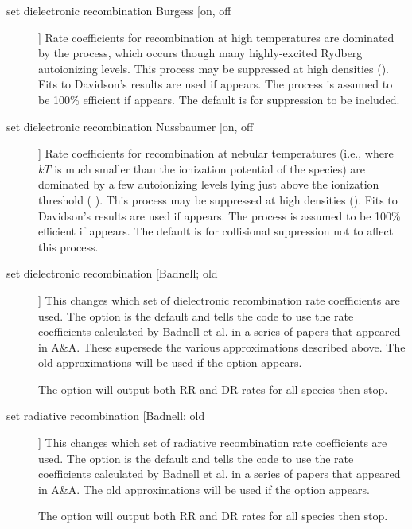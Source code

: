 \begin{description}
\item[set dielectronic recombination Burgess [on, off]]  Rate coefficients
for recombination at high temperatures are dominated by the \citet{Burgess1965}
process, which occurs though many highly-excited Rydberg autoionizing levels.
This process may be suppressed at high densities
(\citealp{Burgess1969,Davidson1975}).
Fits to Davidson's results are used if  appears.
The process is assumed to be 100\% efficient if  appears.
The
default is for suppression to be included.

\item[set dielectronic recombination Nussbaumer [on, off]]
Rate coefficients
for recombination at nebular temperatures (i.e., where $kT$ is much smaller
than the ionization potential of the species) are dominated by a few
autoionizing levels lying just above the ionization threshold (
\citealp{Nussbaumer1983}).
This process may be suppressed at high densities (\citealp{Davidson1975}).
Fits to Davidson's results are used if  appears.
The
process is assumed to be 100\% efficient if  appears.
The
default is for collisional suppression not to affect this process.

\item[set dielectronic recombination [Badnell; old]]
This changes which set
of dielectronic recombination rate coefficients are used.
The
option is the default and tells the code to use the rate coefficients
calculated by Badnell et al. in a series of papers that
appeared in A\&A.
These supersede the various approximations described above.
The old
approximations will be used if the  option appears.

The  option will output both RR and DR rates
for all species then stop.

\item[set radiative recombination [Badnell; old]]   This changes
which set of
radiative recombination rate coefficients are used.
The  option
is the default and tells the code to use the rate coefficients
calculated by Badnell et al. in a series of papers that
appeared in A\&A.
The old
approximations will be used if the 
option appears.

The  option will output both RR and DR rates for
all species then stop.
\end{description}

